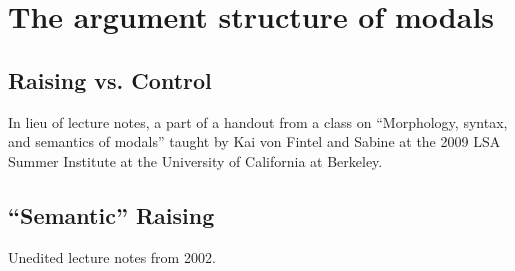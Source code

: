 \chapter{The argument structure of modals}
\label{chap:arg}


\minitoc

\section{Raising vs. Control}
\label{sec:raising-control}

In lieu of lecture notes, a part of a handout from a class on ``Morphology,
syntax, and semantics of modals'' taught by Kai von Fintel and Sabine at the 2009
LSA Summer Institute at the University of California at Berkeley.



\newpage
\section{``Semantic'' Raising}
\label{sec:semantic-raising}

Unedited lecture notes from 2002.







